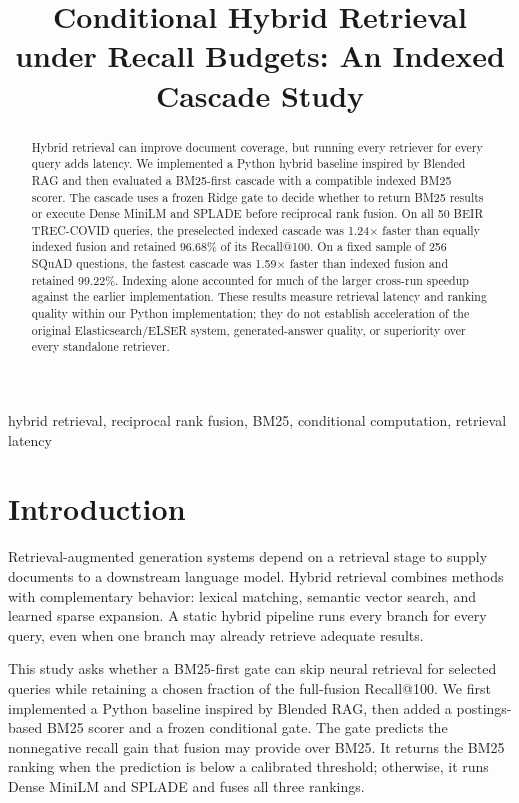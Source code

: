 \documentclass[conference]{IEEEtran}
\title{Conditional Hybrid Retrieval under Recall Budgets: An Indexed Cascade Study}
\author{\IEEEauthorblockN{Ali Omar, Abdallah Mestrah, and Abbas Yazbek}
\IEEEauthorblockA{Lebanese University\\
Supervisor: Dr. Ahmad Abboud}}
\begin{document}
\maketitle

\begin{abstract}
Hybrid retrieval can improve document coverage, but running every retriever for every query adds latency. We implemented a Python hybrid baseline inspired by Blended RAG and then evaluated a BM25-first cascade with a compatible indexed BM25 scorer. The cascade uses a frozen Ridge gate to decide whether to return BM25 results or execute Dense MiniLM and SPLADE before reciprocal rank fusion. On all 50 BEIR TREC-COVID queries, the preselected indexed cascade was 1.24$\times$ faster than equally indexed fusion and retained 96.68\% of its Recall@100. On a fixed sample of 256 SQuAD questions, the fastest cascade was 1.59$\times$ faster than indexed fusion and retained 99.22\%. Indexing alone accounted for much of the larger cross-run speedup against the earlier implementation. These results measure retrieval latency and ranking quality within our Python implementation; they do not establish acceleration of the original Elasticsearch/ELSER system, generated-answer quality, or superiority over every standalone retriever.
\end{abstract}

\begin{IEEEkeywords}
hybrid retrieval, reciprocal rank fusion, BM25, conditional computation, retrieval latency
\end{IEEEkeywords}

\section{Introduction}
Retrieval-augmented generation systems depend on a retrieval stage to supply documents to a downstream language model. Hybrid retrieval combines methods with complementary behavior: lexical matching, semantic vector search, and learned sparse expansion. A static hybrid pipeline runs every branch for every query, even when one branch may already retrieve adequate results.

This study asks whether a BM25-first gate can skip neural retrieval for selected queries while retaining a chosen fraction of the full-fusion Recall@100. We first implemented a Python baseline inspired by Blended RAG, then added a postings-based BM25 scorer and a frozen conditional gate. The gate predicts the nonnegative recall gain that fusion may provide over BM25. It returns the BM25 ranking when the prediction is below a calibrated threshold; otherwise, it runs Dense MiniLM and SPLADE and fuses all three rankings.
\end{document}

